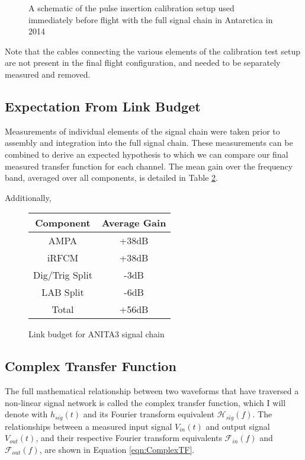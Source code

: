 \begin{figure}
	\caption{A schematic of the pulse insertion calibration setup used immediately before flight with the full signal chain in Antarctica in 2014}
	\label{fig:sigChainSetup}
\end{figure}
			
	Note that the cables connecting the various elements of the calibration test setup are not present in the final flight configuration, and needed to be separately measured and removed.
			

	\subsection{Expectation From Link Budget}
		Measurements of individual elements of the signal chain were taken prior to assembly and integration into the full signal chain.  These measurements can be combined to derive an expected hypothesis to which we can compare our final measured transfer function for each channel.  The mean gain over the frequency band, averaged over all components, is detailed in Table \ref{tab:linkBudget}.
		
		Additionally, 
		
	\begin{figure}
		\centering
		\begin{tabular}{| c | c |}
			\hline
			Component & Average Gain \\ \hline \hline
			AMPA & +38dB \\
			iRFCM & +38dB \\
			Dig/Trig Split & -3dB \\
			LAB Split & -6dB \\ \hline
			Total & +56dB \\
			\hline
		\end{tabular}
	\caption{Link budget for ANITA3 signal chain}
	\label{tab:linkBudget}
	\end{figure}


		
	\subsection{Complex Transfer Function}
		The full mathematical relationship between two waveforms that have traversed a non-linear signal network is called the complex transfer function, which I will denote with $h_{sig}(t)$ and its Fourier transform equivalent $\mathcal{H}_{sig}(f)$.  The relationships between a measured input signal $V_{in}(t)$ and output signal $V_{out}(t)$, and their respective Fourier transform equivalents $\mathcal{F}_{in}(f)$ and $\mathcal{F}_{out}(f)$, are shown in Equation \ref{eqn:ComplexTF}.
	
